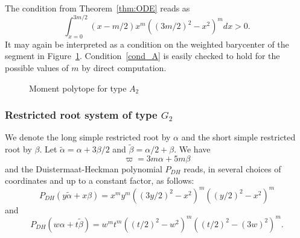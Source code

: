 \documentclass[JEP,XML,SOM,Unicode, NoEqCountersInSection, NoFloatCountersInSection]{cedram}
\theoremstyle{plain}
\theoremstyle{definition}
\begin{document}
The condition from Theorem~\ref{thm:ODE} reads as
\begin{equation}
\label{cond_A}
\int_{x=0}^{3m/2}
(x-m/2)
x^m((3m/2)^2-x^2)^m dx
>0.
\end{equation}
It may again be interpreted as a condition on the weighted barycenter of the segment in
Figure~\ref{fig:A2pol}.
Condition~\eqref{cond_A} is easily checked to hold for the possible values
of $m$ by direct computation.

\begin{figure}
\smaller\centering
{}
\caption{Moment polytope for type $A_2$}
\label{fig:A2pol}
\end{figure}

\subsubsection{Restricted root system of type $G_2$}

We denote the long simple restricted root by $\alpha$
and the short simple restricted root by $\beta$.
Let $\tilde{\alpha}= \alpha+3\beta/2$ and
$\tilde{\beta}= \alpha/2+\beta$.
We have
\[ \varpi = 3m\alpha+5m\beta \]
and the Duistermaat-Heckman polynomial $P_{DH}$ reads, in several choices
of coordinates and up to a constant factor, as follows:
\begin{equation*}
P_{DH}(y\tilde{\alpha}+x\beta)=
x^my^m((3y/2)^2-x^2)^m((y/2)^2-x^2)^m
\end{equation*}
and
\begin{equation*}
P_{DH}(w\alpha+t\tilde{\beta})=
w^mt^m((t/2)^2-w^2)^m((t/2)^2-(3w)^2)^m.
\end{equation*}
\end{document}

